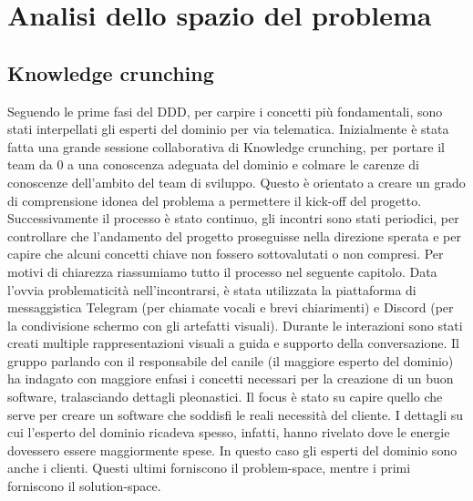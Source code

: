 \chapter{Analisi dello spazio del problema}

	\section{Knowledge crunching}
	Seguendo le prime fasi del DDD, per carpire i concetti più fondamentali, sono stati interpellati gli esperti del dominio per via telematica. 
	Inizialmente è stata fatta una grande sessione collaborativa di Knowledge crunching, per portare il team da 0 a una conoscenza adeguata del dominio e colmare le carenze di conoscenze dell'ambito del team di sviluppo. Questo è orientato a creare un grado di comprensione idonea del problema a permettere il kick-off del progetto.  
	Successivamente il processo è stato continuo, gli incontri sono stati periodici, per controllare che l'andamento del progetto proseguisse nella direzione sperata e per capire che alcuni concetti chiave non fossero sottovalutati o non compresi. 
	Per motivi di chiarezza riassumiamo tutto il processo nel seguente capitolo.
	Data l'ovvia problematicità nell'incontrarsi, è stata utilizzata la piattaforma di messaggistica Telegram (per chiamate vocali e brevi chiarimenti) e Discord (per la condivisione schermo con gli artefatti visuali). Durante le interazioni sono stati creati multiple rappresentazioni visuali a guida e supporto della conversazione. 
	Il gruppo parlando con il responsabile del canile (il maggiore esperto del dominio) ha indagato con maggiore enfasi i concetti necessari per la creazione di un buon software, tralasciando dettagli pleonastici. Il focus è stato su capire quello che serve per creare un software che soddisfi le reali necessità del cliente. I dettagli su cui l'esperto del dominio ricadeva spesso, infatti, hanno rivelato dove le energie dovessero essere maggiormente spese. 
	In questo caso gli esperti del dominio sono anche i clienti. Questi ultimi forniscono il problem-space, mentre i primi forniscono il solution-space.
	
